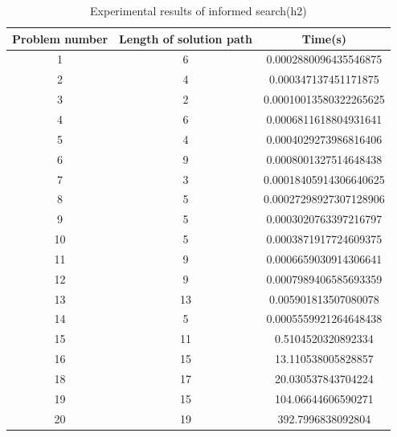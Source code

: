 \documentclass{article}
\begin{document}
\begin{table}[H]
\caption{Experimental results of informed search(h2)}
    \begin{tabular}{ccc}
    \toprule
    Problem number & Length of solution path & Time(s)               \\
    \midrule
    1         & 6                       & 0.0002880096435546875  \\
    2         & 4                       & 0.000347137451171875 \\
    3         & 2                       & 0.00010013580322265625 \\
    4         & 6                       & 0.0006811618804931641 \\
    5         & 4                       & 0.0004029273986816406 \\
    6         & 9                       & 0.0008001327514648438   \\
    7         & 3                       & 0.00018405914306640625   \\
    8         & 5                       & 0.00027298927307128906 \\
    9         & 5                       & 0.0003020763397216797 \\
    10        & 5                       & 0.0003871917724609375    \\
    11        & 9                       & 0.0006659030914306641   \\
    12        & 9                       & 0.0007989406585693359    \\
    13        & 13                      & 0.005901813507080078    \\
    14        & 5                       & 0.0005559921264648438 \\
    15        & 11                      & 0.5104520320892334   \\
    16        & 15                      & 13.110538005828857     \\
    18        & 17                      & 20.030537843704224     \\
    19        & 15                      & 104.06644606590271     \\
    20        & 19                      & 392.7996838092804    \\
    \bottomrule
    \end{tabular}
\end{table}
\end{document}
